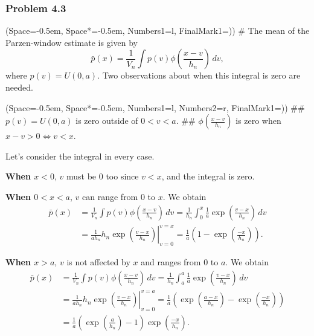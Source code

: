 \documentclass[12pt, a4paper]{article}
\newcommand{\listSpace}{-0.5em}%
\begin{document}
\subsubsection*{Problem 4.3}
\begin{easylist}[enumerate]
\ListProperties(Space=\listSpace, Space*=\listSpace, Numbers1=l, FinalMark1={)})
# The mean of the Parzen-window estimate is given by
\begin{equation*}
	\bar{p}(x) = \frac{1}{V_n} \int p(v) \phi \left( \frac{x-v}{h_n} \right) \, dv,
\end{equation*}
where $p(v) = U(0, a)$.
Two observations about when this integral is zero are needed.

\begin{easylist}
	\ListProperties(Space=\listSpace, Space*=\listSpace, Numbers1=l, Numbers2=r, FinalMark1={)})
## $p(v) = U(0, a)$ is zero outside of $0 < v < a$.
## $\phi \left( \frac{x-v}{h_n} \right)$ is zero when $x - v >0 \Leftrightarrow v < x$.
\end{easylist}
Let's consider the integral in every case.

\textbf{When $x < 0$}, $v$ must be $0$ too since $v < x$, and the integral is zero.

\textbf{When $0 < x < a$}, $v$ can range from $0$ to $x$. We obtain
\begin{align*}
	\bar{p}(x) &= 
	\frac{1}{V_n} \int p(v) \phi \left( \frac{x-v}{h_n} \right) \, dv =
	\frac{1}{h_n} \int_{0}^x \frac{1}{a} \exp \left( \frac{v - x}{h_n} \right) \, dv \\
	&= \left .\frac{1}{a h_n} h_n \exp \left( \frac{v - x}{h_n} \right) \right|_{v=0}^{v=x} = \frac{1}{a} \left( 1 - \exp \left( \frac{-x}{h_n} \right) \right).
\end{align*}

\textbf{When $x > a$}, $v$ is not affected by $x$ and ranges from $0$ to $a$.
We obtain
\begin{align*}
\bar{p}(x) &= 
\frac{1}{V_n} \int p(v) \phi \left( \frac{x-v}{h_n} \right) \, dv =
\frac{1}{h_n} \int_{a}^a \frac{1}{a} \exp \left( \frac{v - x}{h_n} \right) \, dv \\
&= \left .\frac{1}{a h_n} h_n \exp \left( \frac{v - x}{h_n} \right) \right|_{v=0}^{v=a} 
= \frac{1}{a} \left( \exp \left( \frac{a - x}{h_n} \right) - \exp \left( \frac{-x}{h_n}  \right) \right) \\
& = \frac{1}{a} \left( \exp \left( \frac{a }{h_n} \right) - 1 \right) 
\exp \left( \frac{-x}{h_n}  \right).
\end{align*}
 

\end{easylist}
\end{document}
